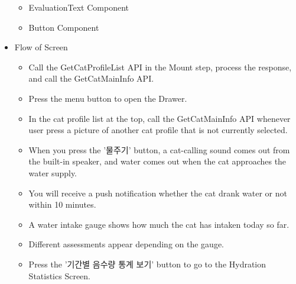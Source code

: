 \documentclass[conference]{IEEEtran}
\begin{document}
\begin{itemize}
\begin{itemize}
        \item EvaluationText Component
        \item Button Component
    \end{itemize}
    \item Flow of Screen
    \begin{itemize}
        \item Call the GetCatProfileList API in the Mount step, process the response, and call the GetCatMainInfo API.
        \item Press the menu button to open the Drawer.
        \item In the cat profile list at the top, call the GetCatMainInfo API whenever user press a picture of another cat profile that is not currently selected.
        \item When you press the '물주기' button, a cat-calling sound comes out from the built-in speaker, and water comes out when the cat approaches the water supply.
        \item You will receive a push notification whether the cat drank water or not within 10 minutes.
        \item A water intake gauge shows how much the cat has intaken today so far.
        \item Different assessments appear depending on the gauge.
        \item Press the '기간별 음수량 통계 보기' button to go to the Hydration Statistics Screen.
    \end{itemize}
\end{itemize}
\newpage
\end{document}
